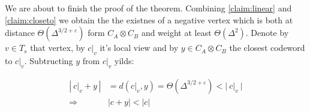  We are about to finish the proof of the theorem. Combining \cref{claim:linear} and \cref{claim:closeto} we obtain the the existnes of a negative vertex which is both at distance $\Theta\left(\Delta^{3/2 + \varepsilon}\right)$ form $C_{A}\otimes C_{B}$ and weight at least $\Theta\left( \Delta^{2} \right)$. Denote by $v \in T_{s}$ that vertex, by $c|_{v}$ it's local view and by $y \in C_{A}\otimes C_{B}$ the closest codeword to $c|_{v}$. Subtructing $y$ from $c|_{v}$ yilds: 
 
 \begin{equation*}
   \begin{split}
     \left| \  c|_{v} + y \  \right| &= d\left( c|_{v}, y  \right) = \Theta\left( \Delta^{3/2 + \varepsilon} \right) < | \  c|_{v} \  |     \\
     \Rightarrow & | c + y| < |c| 
   \end{split}
 \end{equation*}





